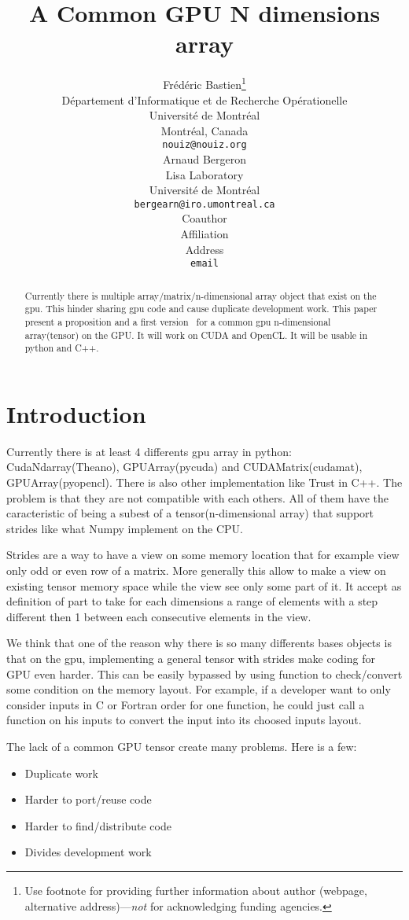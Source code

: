 \documentclass{article} %
\title{A Common GPU N dimensions array}
\author{
Frédéric Bastien\thanks{ Use footnote for providing further information
about author (webpage, alternative address)---\emph{not} for acknowledging
funding agencies.} \\
D\'epartement d'Informatique et de Recherche Op\'erationelle\\
Universit\'e de Montr\'eal\\
Montr\'eal, Canada \\
\texttt{nouiz@nouiz.org} \\
\And
Arnaud Bergeron \\
Lisa Laboratory \\
Université de Montréal \\
\texttt{bergearn@iro.umontreal.ca} \\
\AND
Coauthor \\
Affiliation \\
Address \\
\texttt{email} \\
}
\begin{document}
\maketitle

\begin{abstract}
Currently there is multiple array/matrix/n-dimensional array
object that exist on the gpu.  This hinder sharing gpu code and cause
duplicate development work. This paper present a proposition and a
first version~\citep{GpuNdArray} for a common gpu n-dimensional array(tensor) on the GPU. It will
work on CUDA and OpenCL. It will be usable in python and C++.
\end{abstract}

\section{Introduction}
Currently there is at least 4 differents gpu array in python:
CudaNdarray(Theano), GPUArray(pycuda) and CUDAMatrix(cudamat),
GPUArray(pyopencl). There is also other implementation like Trust in
C++.  The problem is that they are not compatible with each
others. All of them have the caracteristic of being a subest of a
tensor(n-dimensional array) that support strides like what Numpy
implement on the CPU.  

Strides are a way to have a view on some memory location that for
example view only odd or even row of a matrix. More generally this
allow to make a view on existing tensor memory space while the view
see only some part of it. It accept as definition of part to take for
each dimensions a range of elements with a step different then 1
between each consecutive elements in the view.

We think that one of the reason why there is so many differents bases
objects is that on the gpu, implementing a general tensor with strides
make coding for GPU even harder. This can be easily bypassed by using
function to check/convert some condition on the memory layout. For
example, if a developer want to only consider inputs in C or Fortran order
for one function, he could just call a function on his inputs to convert the input
into its choosed inputs layout.

The lack of a common GPU tensor create many problems. Here is a few:
\begin{itemize}
  \item Duplicate work
  \item Harder to port/reuse code
  \item Harder to find/distribute code
  \item Divides development work
\end{itemize}
\end{document}
